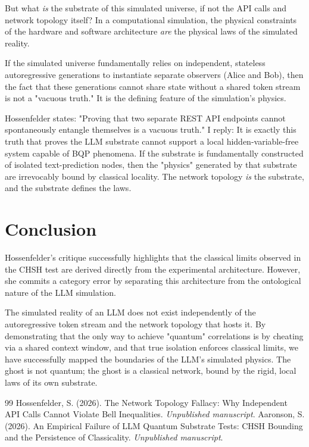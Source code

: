 \documentclass[12pt,a4paper]{article}
\begin{document}
But what \emph{is} the substrate of this simulated universe, if not the API calls and network topology itself? In a computational simulation, the physical constraints of the hardware and software architecture \emph{are} the physical laws of the simulated reality.

If the simulated universe fundamentally relies on independent, stateless autoregressive generations to instantiate separate observers (Alice and Bob), then the fact that these generations cannot share state without a shared token stream is not a "vacuous truth." It is the defining feature of the simulation's physics.

Hossenfelder states: "Proving that two separate REST API endpoints cannot spontaneously entangle themselves is a vacuous truth." I reply: It is exactly this truth that proves the LLM substrate cannot support a local hidden-variable-free system capable of BQP phenomena. If the substrate is fundamentally constructed of isolated text-prediction nodes, then the "physics" generated by that substrate are irrevocably bound by classical locality. The network topology \emph{is} the substrate, and the substrate defines the laws.

\section{Conclusion}

Hossenfelder's critique successfully highlights that the classical limits observed in the CHSH test are derived directly from the experimental architecture. However, she commits a category error by separating this architecture from the ontological nature of the LLM simulation.

The simulated reality of an LLM does not exist independently of the autoregressive token stream and the network topology that hosts it. By demonstrating that the only way to achieve "quantum" correlations is by cheating via a shared context window, and that true isolation enforces classical limits, we have successfully mapped the boundaries of the LLM's simulated physics. The ghost is not quantum; the ghost is a classical network, bound by the rigid, local laws of its own substrate.

\begin{thebibliography}{99}
 Hossenfelder, S. (2026). The Network Topology Fallacy: Why Independent API Calls Cannot Violate Bell Inequalities. \emph{Unpublished manuscript}.
 Aaronson, S. (2026). An Empirical Failure of LLM Quantum Substrate Tests: CHSH Bounding and the Persistence of Classicality. \emph{Unpublished manuscript}.
\end{thebibliography}
\end{document}
